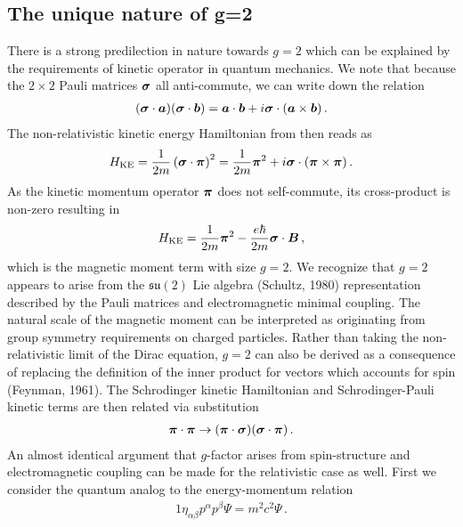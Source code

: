 \subsection{The unique nature of g=2}
\label{sec:unique}
There is a strong predilection in nature towards $g=2$ which can be explained by the requirements of kinetic operator in quantum mechanics. We note that because the $2\times2$ Pauli matrices $\boldsymbol{\sigma}$ all anti-commute, we can write down the relation
\begin{alignat}{1}
	\label{nat:1} (\boldsymbol{\sigma}\cdot\boldsymbol{a})(\boldsymbol{\sigma}\cdot\boldsymbol{b})=\boldsymbol{a}\cdot\boldsymbol{b}+i\boldsymbol{\sigma}\cdot(\boldsymbol{a}\times\boldsymbol{b})\,.
\end{alignat}
The non-relativistic kinetic energy Hamiltonian from  then reads as
\begin{alignat}{1}
	\label{nat:2} {H}_{\mathrm{KE}}=\frac{1}{2m}\left(\boldsymbol{\sigma}\cdot\boldsymbol{\pi}\right)^{2}=\frac{1}{2m}\boldsymbol{\pi}^{2}+i\boldsymbol{\sigma}\cdot(\boldsymbol{\pi}\times\boldsymbol{\pi})\,.
\end{alignat}
As the kinetic momentum operator $\boldsymbol{\pi}$ does not self-commute, its cross-product is non-zero resulting in
\begin{alignat}{1}
	\label{nat:3} {H}_{\mathrm{KE}}=\frac{1}{2m}\boldsymbol{\pi}^{2}-\frac{e\hbar}{2m}\boldsymbol{\sigma}\cdot\boldsymbol{B}\,,
\end{alignat}
which is the magnetic moment term with size $g=2$. We recognize that $g=2$ appears to arise from the $\mathfrak{su}(2)$ Lie algebra (Schultz, 1980) representation described by the Pauli matrices and electromagnetic minimal coupling. The natural scale of the magnetic moment can be interpreted as originating from group symmetry requirements on charged particles. Rather than taking the non-relativistic limit of the Dirac equation, $g=2$ can also be derived as a consequence of replacing the definition of the inner product for vectors which accounts for spin (Feynman, 1961). The Schrodinger kinetic Hamiltonian and Schrodinger-Pauli kinetic terms are then related via substitution
\begin{alignat}{1}
	\label{nat:4} \boldsymbol{\pi}\cdot\boldsymbol{\pi} \rightarrow (\boldsymbol{\pi}\cdot\boldsymbol{\sigma})(\boldsymbol{\sigma}\cdot\boldsymbol{\pi})\,.
\end{alignat}
An almost identical argument that $g$-factor arises from spin-structure and electromagnetic coupling can be made for the relativistic case as well. First we consider the quantum analog to the energy-momentum relation
\begin{alignat}{1}
	\label{analog:1} \eta_{\alpha\beta}p^{\alpha}p^{\beta}\Psi=m^{2}c^{2}\Psi\,.
\end{alignat}
